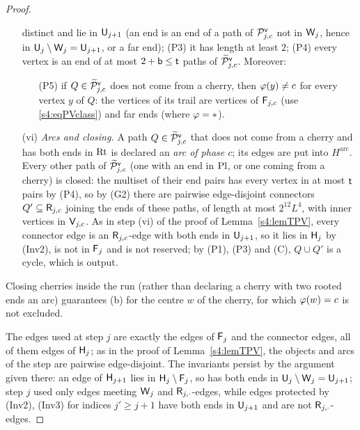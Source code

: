\begin{proof}
\begin{itemize}
  distinct and lie in $\vU_{j+1}$ (an end is an end of a path of $\vPaths_{j,c}$ not in $\vW_j$, hence in
  $\vU_j\setminus\vW_j=\vU_{j+1}$, or a far end); (P3) it has length at least $2$; (P4) every vertex is an end of at
  most $2+\vb\le\vt$ paths of $\vPathsQ_{j,c}$. Moreover:
  \begin{itemize}
  \item[(P5)] if $Q\in\vPathsQ_{j,c}$ does not come from a cherry, then $\extph(y)\ne c$ for every vertex $y$ of $Q$:
    the vertices of its trail are vertices of $\vF_{j,c}$ (use \eqref{s4:eqPVclass}) and far ends (where
    $\extph=*$).
  \end{itemize}
\item[(vi)] \emph{Arcs and closing.} A path $Q\in\vPathsQ_{j,c}$ that does not come from a cherry and has both ends in
  $\mathrm{Rt}$ is declared an \emph{arc of phase $c$}; its edges are put into $H^{\mathrm{arc}}$. Every other path of
  $\vPathsQ_{j,c}$ (one with an end in $\mathrm{Pl}$, or one coming from a cherry) is closed: the multiset of their end pairs
  has every vertex in at most $\mathsf{t}$ pairs by (P4), so by (G2) there are pairwise edge-disjoint connectors
  $Q'\subseteq\mathsf{R}_{j,c}$ joining the ends of these paths, of length at most $2^{12}L^4$, with inner vertices in
  $\mathsf{V}_{j,c}$. As in step (vi) of the proof of Lemma~\ref{s4:lemTPV}, every connector edge is an
  $\mathsf{R}_{j,c}$-edge with both ends in $\vU_{j+1}$, so it lies in $\mathsf{H}_j$ by (Inv2), is not in $\mathsf{F}_j$ and is not
  reserved; by (P1), (P3) and \textup{(C)}, $Q\cup Q'$ is a cycle, which is output.
\end{itemize}
Closing cherries inside the run (rather than declaring a cherry with two rooted ends an arc) guarantees (b) for the
centre $w$ of the cherry, for which $\varphi(w)=c$ is not excluded.

The edges used at step $j$ are exactly the edges of $\mathsf{F}_j$ and the connector edges, all of them edges of $\mathsf{H}_j$;
as in the proof of Lemma~\ref{s4:lemTPV}, the objects and arcs of the step are pairwise edge-disjoint. The invariants
persist by the argument given there: an edge of $\mathsf{H}_{j+1}$ lies in $\mathsf{H}_j\setminus\mathsf{F}_j$, so has both ends in
$\vU_j\setminus\vW_j=\vU_{j+1}$; step $j$ used only edges meeting $\vW_j$ and $\mathsf{R}_{j,\cdot}$-edges, while edges
protected by (Inv2), (Inv3) for indices $j'\ge j+1$ have both ends in $\vU_{j+1}$ and are not $\mathsf{R}_{j,\cdot}$-edges.


\end{proof}
